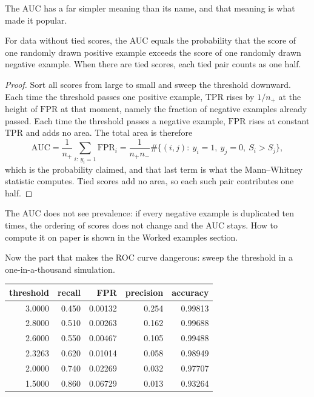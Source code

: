 The AUC has a far simpler meaning than its name, and that meaning is what made it popular.

\begin{proposisi}
For data without tied scores, the AUC equals the probability that the score of one randomly drawn
positive example exceeds the score of one randomly drawn negative example. When there are tied
scores, each tied pair counts as one half.
\end{proposisi}

\begin{proof}[Proof]
Sort all scores from large to small and sweep the threshold downward. Each time the threshold
passes one positive example, $\mathrm{TPR}$ rises by $1/n_+$ at the height of $\mathrm{FPR}$ at
that moment, namely the fraction of negative examples already passed. Each time the threshold
passes a negative example, $\mathrm{FPR}$ rises at constant $\mathrm{TPR}$ and adds no area. The
total area is therefore
\[
\mathrm{AUC}=\frac1{n_+}\sum_{i:\ y_i=1}\mathrm{FPR}_i
=\frac{1}{n_+n_-}\#\{(i,j):\ y_i=1,\ y_j=0,\ S_i>S_j\},
\]
which is the probability claimed, and that last term is what the Mann--Whitney statistic computes.
Tied scores add no area, so each such pair contributes one half.
\end{proof}

The AUC does not see prevalence: if every negative example is duplicated ten times, the ordering of
scores does not change and the AUC stays. How to compute it on paper is shown in the Worked
examples section.

Now the part that makes the ROC curve dangerous: sweep the threshold in a one-in-a-thousand
simulation.

\begin{center}
\small
\begin{tabular}{rrrrr}
\hline
threshold & recall & FPR & precision & accuracy \\
\hline
3.0000 & 0.450 & 0.00132 & 0.254 & 0.99813 \\
2.8000 & 0.510 & 0.00263 & 0.162 & 0.99688 \\
2.6000 & 0.550 & 0.00467 & 0.105 & 0.99488 \\
2.3263 & 0.620 & 0.01014 & 0.058 & 0.98949 \\
2.0000 & 0.740 & 0.02269 & 0.032 & 0.97707 \\
1.5000 & 0.860 & 0.06729 & 0.013 & 0.93264 \\
\hline
\end{tabular}
\end{center}

